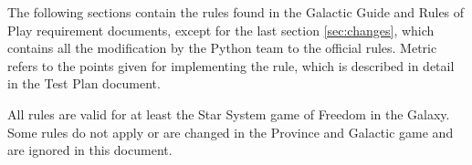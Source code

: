 \documentclass[a4wide]{article}
\newcounter{rc}
\begin{document}
The following sections contain the rules found in the Galactic Guide and Rules of Play requirement documents, except for the last section \ref{sec:changes}, which contains all the modification by the Python team to the official rules. Metric refers to the points given for implementing the rule, which is described in detail in the Test Plan document.

All rules are valid for at least the Star System game of Freedom in the Galaxy. Some rules do not apply or are changed in the Province and Galactic game and are ignored in this document.

\newcommand{\first}{.5cm}
\newcommand{\second}{11.0cm}
\newcommand{\third}{2.5cm}
\newcommand{\fourth}{1.5cm}








































\end{document}
